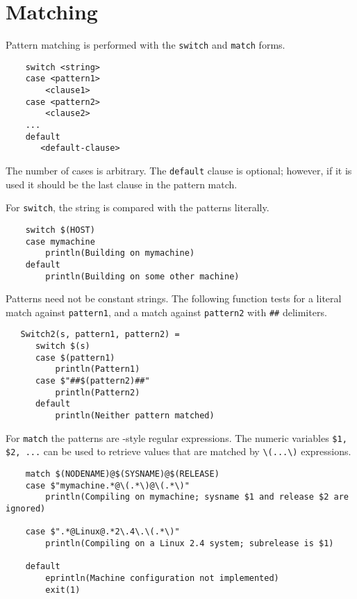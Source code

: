 \section{Matching}
\label{section:match}

Pattern matching is performed with the \verb+switch+ and \verb+match+ forms.

\begin{verbatim}
    switch <string>
    case <pattern1>
        <clause1>
    case <pattern2>
        <clause2>
    ...
    default
       <default-clause>
\end{verbatim}

The number of cases is arbitrary.
The \verb+default+ clause is optional; however, if it is used it should
be the last clause in the pattern match.

For \verb+switch+, the string is compared with the patterns literally.

\begin{verbatim}
    switch $(HOST)
    case mymachine
        println(Building on mymachine)
    default
        println(Building on some other machine)
\end{verbatim}

Patterns need not be constant strings.  The following function tests
for a literal match against \verb+pattern1+, and a match against
\verb+pattern2+ with \verb+##+ delimiters.

\begin{verbatim}
   Switch2(s, pattern1, pattern2) =
      switch $(s)
      case $(pattern1)
          println(Pattern1)
      case $"##$(pattern2)##"
          println(Pattern2)
      default
          println(Neither pattern matched)
\end{verbatim}

For \verb+match+ the patterns are -style regular expressions.
The numeric variables \verb+$1, $2, ...+ can be used to retrieve values
that are matched by \verb+\(...\)+ expressions.

\begin{verbatim}
    match $(NODENAME)@$(SYSNAME)@$(RELEASE)
    case $"mymachine.*@\(.*\)@\(.*\)"
        println(Compiling on mymachine; sysname $1 and release $2 are ignored)

    case $".*@Linux@.*2\.4\.\(.*\)"
        println(Compiling on a Linux 2.4 system; subrelease is $1)

    default
        eprintln(Machine configuration not implemented)
        exit(1)
\end{verbatim}

